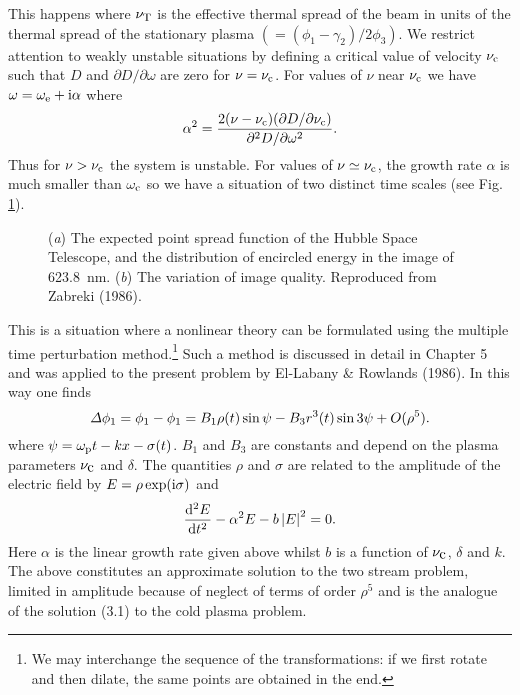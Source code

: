 This happens where $\nu_{\hbox{\sc t}}$ is the effective thermal
spread of the beam in units of the thermal spread of the stationary
plasma $( = (\phi_1 - \gamma_2) / {2 \phi_3})$.
We
restrict attention to weakly unstable situations by defining a critical
value of velocity $\nu_{\hbox{\scriptsize c}}$ such that $D$ and
$\partial D / \partial \omega$ are zero for $ \nu = \nu_{\hbox{\scriptsize c}}$.
For values of $\nu$ near $\nu_{\hbox{\scriptsize c}}$
we have $\omega = \omega_{\hbox{\scriptsize e}} + {\rm i} \alpha$ where
\begin{equation}
 \alpha^2 = \frac{2 ( \nu - \nu_{\hbox{\scriptsize c}})(\partial D / \partial \nu_{\hbox{\scriptsize c}})}
                 {\partial^2 D/ \partial \omega^2}.
\end{equation}
Thus for $ \nu > \nu_{\hbox{\scriptsize c}} $ the system
is unstable. For values of $ \nu \simeq \nu_{\hbox{\scriptsize c}}$,
the growth rate $\alpha$ is much smaller than $\omega_{\hbox{\scriptsize c}}$
so we have a situation of two distinct time scales (see Fig. \ref{fig3}).
 \begin{figure} %
  \vspace*{2.5in}
  \caption{({\it a\/}) The expected point spread function of the Hubble Space
               Telescope, and the distribution of encircled energy in
               the image of \mbox{623.8 nm.}
  ({\it b\/}) The variation of image quality. Reproduced from Zabreki (1986).}
 \label{fig3}
\end{figure}
This is a situation where a nonlinear theory can be formulated using
the multiple time perturbation method.\footnote{We
may interchange the sequence of the
transformations: if we first rotate and then dilate, the same
points are obtained in the end.}
Such a method
is discussed in detail in Chapter 5 and was applied to the present
problem by El-Labany \& Rowlands (1986). In this way one finds
\begin{equation}
  {\mit \Delta}\phi_1 = \phi_1 - \phi_1
   = B_1 \rho(t) \sin \psi - B_3 r^3(t) \sin 3 \psi + O(\rho^5 ).
 \label{eq:explicit}
\end{equation}
where $\psi = \omega_{\hbox{\scriptsize p}}t - kx - \sigma(t)$.
$B_1$ and $B_3$ are constants and
depend on the plasma parameters $\nu_{\hbox{c}}$ and $\delta$.
The quantities $\rho$ and $\sigma$  are related to the
amplitude of the electric field by $E=\rho\exp({\rm i}\sigma)$ and
\begin{equation}
\frac{{\rm d}^2 E}{{\rm d} t^2} - \alpha^2 E -
   b \left| E \right| ^2 = 0.
\end{equation}
Here $ \alpha $ is the linear growth rate given above whilst
$b $ is a function of $\nu _{\hbox{c}}$, $\delta$ and
$k $. The above constitutes an approximate solution to the two
stream problem, limited in amplitude because of neglect of terms of
order $\rho^5$ and is the analogue of the solution (3.1)
to the cold plasma problem.

